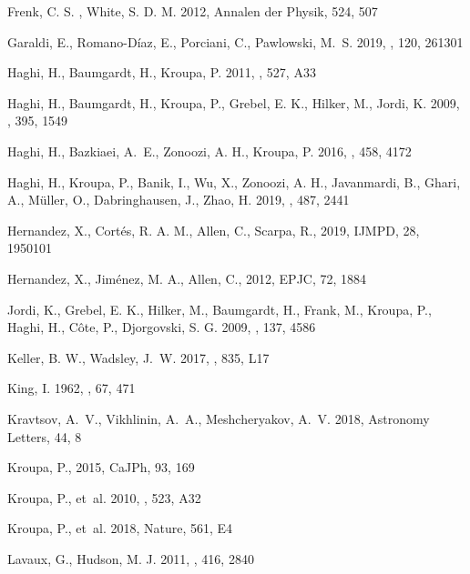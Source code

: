 \documentclass[twocolumn,tighten]{aastex63}
\begin{document}
\begin{thebibliography}{}
 {{Frenk}, C. S. }, {{White}, S. D. M. } 2012, {Annalen der Physik}, {524}, {507}
   
 {{Garaldi}, E.}, {{Romano-D\'{i}az}, E.}, {{Porciani}, C.}, {{Pawlowski}, M.~S.} 2019, \prl, 120, 261301

 {{Haghi}, H.}, {{Baumgardt}, H.}, {{Kroupa}, P.} 2011, \aap, 527, A33   
  
 {{Haghi}, H.}, {{Baumgardt}, H.}, {{Kroupa}, P.}, {{Grebel}, E. K.}, {{Hilker}, M.}, {{Jordi}, K.} 2009, {\mnras}, {395}, {1549}

 {{Haghi}, H.}, {{Bazkiaei}, A.~E.}, {{Zonoozi}, A. H.}, {{Kroupa}, P.} 2016, {\mnras}, {458}, {4172}

 {{Haghi}, H.}, {{Kroupa}, P.}, {{Banik}, I.}, {{Wu}, X.}, {{Zonoozi}, A. H.}, {{Javanmardi}, B.}, {{Ghari}, A.}, {{M\"{u}ller}, O.}, {{Dabringhausen}, J.}, {{Zhao}, H.} 2019, \mnras, 487, 2441

 {{Hernandez}, X.}, {{Cort\'{e}s}, R. A. M.}, {{Allen}, C.},  {{Scarpa}, R.}, 2019, IJMPD, 28, 1950101
  
 {{Hernandez}, X.}, {{Jim\'{e}nez}, M. A.}, {{Allen}, C.}, 2012, EPJC, 72, 1884

 {{Jordi}, K.}, {{Grebel}, E. K.}, {{Hilker}, M.}, {{Baumgardt}, H.}, {{Frank}, M.}, {{Kroupa}, P.}, {{Haghi}, H.}, {{C\^{o}te}, P.}, {{Djorgovski}, S. G.} 2009, \aj, 137, 4586  
  
 {{Keller}, B. W.}, {{Wadsley}, J.~W.} 2017, {\apj}, {835}, {L17}

 {{King}, I.} 1962, {\aj}, {67}, {471}

 {{Kravtsov}, {A.~V.}}, {{Vikhlinin}, {A.~A.}}, {{Meshcheryakov}, A.~V.} 2018, Astronomy Letters, 44, 8 

 {{Kroupa}, P.}, 2015, {CaJPh}, {93}, {169}

 {{Kroupa}, P.}, {et~al.} 2010, {\aap}, {523}, {A32}

 {{Kroupa}, P.}, {et~al.} 2018, {Nature}, {561}, {E4}

 {{Lavaux}, G.}, {{Hudson}, M. J.} 2011, {\mnras}, {416}, {2840} 
  

\end{thebibliography}
\end{document}
